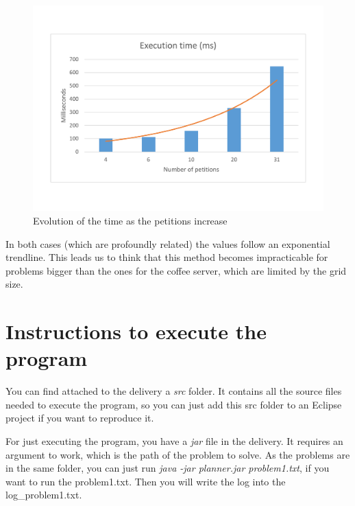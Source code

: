 \documentclass[12pt,a4paper,oneside]{article}
\numberwithin{equation}{section}
\numberwithin{equation}{section}
\theoremstyle{definition}
\begin{document}
\begin{figure}[H]
	\centering
	\includegraphics[scale=0.4]{figures/time.pdf}
	\caption{Evolution of the time as the petitions increase}
	\label{time} 
\end{figure}

In both cases (which are profoundly related) the values follow an exponential trendline. This leads us to think that this method becomes impracticable for problems bigger than the ones for the coffee server, which are limited by the grid size.

\section{Instructions to execute the program}
You can find attached to the delivery a \textit{src} folder. It contains all the source files needed to execute the program, so you can just add this src folder to an Eclipse project if you want to reproduce it.

For just executing the program, you have a \textit{jar} file in the delivery. It requires an argument to work, which is the path of the problem to solve. As the problems are in the same folder, you can just run \textit{java -jar planner.jar problem1.txt}, if you want to run the problem1.txt. Then you will write the log into the log\_problem1.txt.

\newpage
\end{document}
